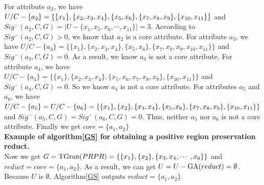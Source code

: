 \documentclass[review]{elsarticle}
\begin{document}
		For attribute $a_2$, we have $U/C-\{a_2\}=\{\{x_1\},\{x_2,x_3,x_4\},\{x_5,x_6\},\\\{x_7,x_8,x_9\},\{x_{10},x_{11}\}\}$ and $ Sig^-(a_2,C,G)=|U-\{x_1,x_5,x_6,\cdots,x_{11}\}|=3$. According to $Sig^-(a_2,C,G)>0$, we know that $a_2$ is a core attribute.
		For attribute $a_3$, we have $U/C-\{a_3\}=\{\{x_1\},\{x_2,x_3,x_4\},\{x_5,x_6\},\{x_7,x_8,x_9,x_{10},x_{11}\}\}$ and 
		$Sig^-(a_3,C,G)=0$. As a result, we know $a_3$ is not a core attribute.
		For attribute $a_4$, we have $U/C-\{a_4\}=\{\{x_1\},\{x_2,x_3,x_4\},\{x_5,x_6,x_7,x_8,x_9\},\{x_{10},x_{11}\}\}$ and
		$Sig^-(a_4,C,G)=0$. So we know $a_4$ is not a core attribute.
		For attributes $a_5$ and $a_6$, we have $U/C-\{a_5\}=U/C-\{a_6\}=\{\{x_1\},\{x_2\},\{x_3,x_4\},\{x_5,x_6\},\{x_7,x_8,\\x_9\},\{x_{10},x_{11}\}\}$ and	$Sig^-(a_5,C,G)=Sig^-(a_6,C,G)=0$. Thus, neither $a_5$ nor $a_6$ is not a core attribute. 
		Finally we get $core=\{a_1,a_2\}$
		\\\textbf{Example of algorithm\ref{GS} for obtaining a positive region preservation reduct.}\\
		Now we get $G={\rm TGran}(PRPR)=\{\{x_1\},\{x_2\},\{x_3,x_4,\cdots,x_6\}\}$ and $reduct=core=\{a_1,a_2\}$. As a result, we can get $U=U-{\rm GA}(reduct)=\emptyset$. Because $U$ is $\emptyset$,  Algorithm\ref{GS} outputs $reduct=\{a_1,a_2\}$.
		 
\end{document}
